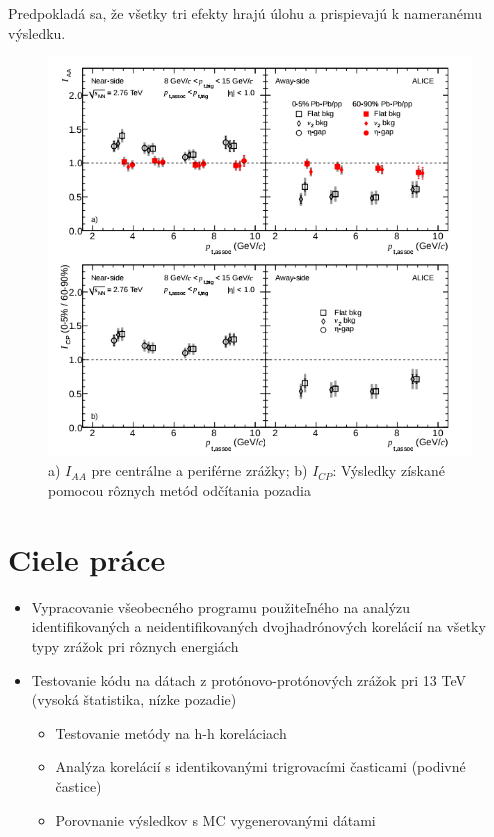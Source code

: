 \documentclass[thesismargins, thesislinespacing]{rnthesis}
\begin{document}
Predpokladá sa, že všetky tri efekty hrajú úlohu a prispievajú k nameranému výsledku.

\begin{figure}[hbtp!]
	\centering
	\includegraphics[scale=1]{./Obrazky_praca/clanok2.png}
	\caption{ a) $I_{AA}$ pre centrálne a periférne zrážky; b) $I_{CP}$: Výsledky získané pomocou rôznych metód odčítania pozadia~\cite{clanok}}
	\label{clanok2}
\end{figure}



\chapter{Ciele práce} 
\begin{itemize}
	\item Vypracovanie všeobecného programu použiteľného na analýzu identifikovaných a neidentifikovaných dvojhadrónových korelácií na všetky typy zrážok pri rôznych energiách
	\item Testovanie kódu na dátach z protónovo-protónových zrážok pri 13 TeV (vysoká štatistika, nízke pozadie)
	\begin{itemize}
		\item Testovanie metódy na h-h koreláciach
		\item Analýza korelácií s identikovanými trigrovacími časticami (podivné častice)
		\item Porovnanie výsledkov s MC vygenerovanými dátami 
	\end{itemize}
\end{itemize}
\end{document}
